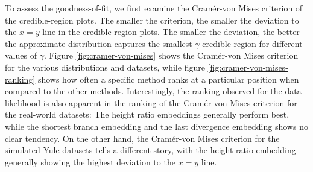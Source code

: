 \documentclass[10pt,letterpaper]{article}
\begin{document}
To assess the goodness-of-fit, we first examine the Cramér-von Mises criterion of the credible-region plots. The smaller the criterion, the smaller the deviation to the $x=y$ line in the credible-region plots. The smaller the deviation, the better the approximate distribution captures the smallest $\gamma$-credible region for different values of $\gamma$. Figure \ref{fig:cramer-von-mises} shows the Cramér-von Mises criterion for the various distributions and datasets, while figure \ref{fig:cramer-von-mises-ranking} shows how often a specific method ranks at a particular position when compared to the other methods. Interestingly, the ranking observed for the data likelihood is also apparent in the ranking of the Cramér-von Mises criterion for the real-world datasets: The height ratio embeddings generally perform best, while the shortest branch embedding and the last divergence embedding shows no clear tendency. On the other hand, the Cramér-von Mises criterion for the simulated Yule datasets tells a different story, with the height ratio embedding generally showing the highest deviation to the $x=y$ line.
\end{document}
